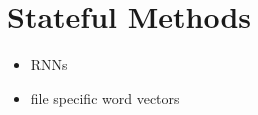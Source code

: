 \section{Stateful Methods}
\label{sec:stateful}

\begin{itemize}
  \item RNNs
  \item file specific word vectors
\end{itemize}
